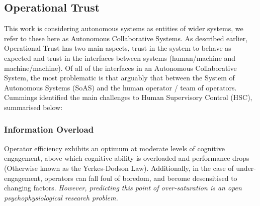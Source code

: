 
\subsection{Operational Trust}

This work is considering autonomous systems as entities of wider systems, we refer to these here as Autonomous Collaborative Systems.
As described earlier, Operational Trust has two main aspects, trust in the system to behave as expected and trust in the interfaces between systems (human/machine and machine/machine). 
Of all of the interfaces in an Autonomous Collaborative System, the most problematic is that arguably that between the System of Autonomous Systems (SoAS) and the human operator / team of operators. 
Cummings identified the main challenges to Human Supervisory Control (HSC), summarised below:\cite{Cummings2010}

\subsubsection{Information Overload}
Operator efficiency exhibits an optimum at moderate levels of cognitive engagement, above which cognitive ability is overloaded and performance drops (Otherwise known as the Yerkes-Dodson Law).
Additionally, in the case of under-engagement, operators can fall foul of boredom, and become desensitised to changing factors.
\textit{However, predicting this point of over-saturation is an open psychophysiological research problem.}

